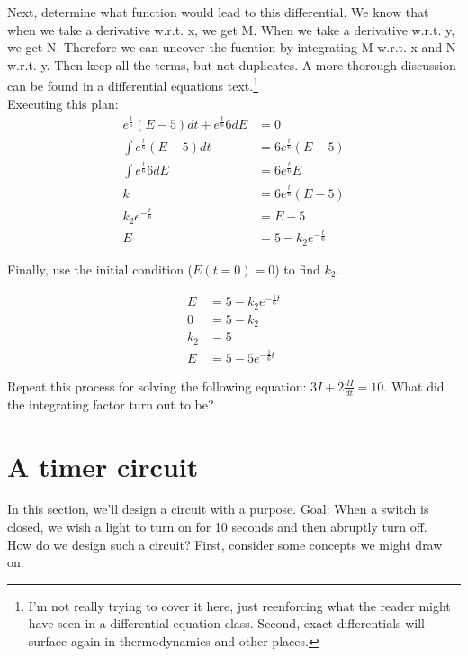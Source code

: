 Next, determine what function would lead to this differential. We know that when we take a derivative w.r.t. x, we get M. When we take a derivative w.r.t. y, we get N. Therefore we can uncover the fucntion by integrating M w.r.t. x and N w.r.t. y. Then keep all the terms, but not duplicates. A more thorough discussion can be found in a differential equations text.\footnote{I'm not really trying to cover it here, just reenforcing what the reader might have seen in a differential equation class. Second, exact differentials will surface again in thermodynamics and other places.}\\

Executing this plan:
\begin{align*}
e^{\frac{t}{6}}(E-5)dt+e^{\frac{t}{6}}6dE&=0\\
\int e^{\frac{t}{6}}(E-5) dt &= 6e^{\frac{t}{6}}(E-5)\\
\int e^{\frac{t}{6}}6 dE &= 6e^{\frac{t}{6}}E\\
k &= 6e^{\frac{t}{6}}(E-5) \tag{Keep all terms, not duplicates}\\
k_2e^{-\frac{t}{6}}&=E-5\tag{Solve for E}\\
E &= 5-k_2e^{-\frac{t}{6}}
\end{align*}

Finally, use the initial condition ($E(t=0)=0$) to find $k_2$.

\begin{align*}
E &= 5-k_2e^{-\frac{1}{6}t}\\
0 &= 5-k_2\\
k_2&=5\\
E &= 5-5e^{-\frac{1}{6}t}
\end{align*}

\begin{clevel}
Repeat this process for solving the following equation: $3I + 2\frac{dI}{dt}=10$. What did the integrating factor turn out to be?
\end{clevel}

\section{A timer circuit}
In this section, we'll design a circuit with a purpose. Goal: When a switch is closed, we wish a light to turn on for 10 seconds and then abruptly turn off.\\

How do we design such a circuit? First, consider some concepts we might draw on. 

